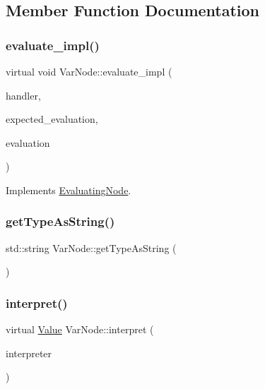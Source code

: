 \subsection{Member Function Documentation}
\mbox{\label{classVarNode_affe926e80803de0a83ce88f9a0d97db3}} 
\subsubsection{\texorpdfstring{evaluate\+\_\+impl()}{evaluate\_impl()}}
{\footnotesize\ttfamily virtual void Var\+Node\+::evaluate\+\_\+impl (\begin{DoxyParamCaption}\item[{\hyperlink{classSystemHandler}{System\+Handler} $\ast$}]{handler,  }\item[{\hyperlink{statics_8h_a6664c451ca7787483a7981cc1de68dbb}{E\+V\+A\+L\+U\+A\+T\+I\+O\+N\+\_\+\+T\+Y\+PE}}]{expected\+\_\+evaluation,  }\item[{struct \hyperlink{structEvaluation}{Evaluation} $\ast$}]{evaluation }\end{DoxyParamCaption})\hspace{0.3cm}{\ttfamily [virtual]}}



Implements \hyperlink{classEvaluatingNode_a085fa06e0b46a93c814dc55cda0c1b26}{Evaluating\+Node}.

\mbox{\label{classVarNode_afcde838758181438e89f8f91699c9d5b}} 
\subsubsection{\texorpdfstring{get\+Type\+As\+String()}{getTypeAsString()}}
{\footnotesize\ttfamily std\+::string Var\+Node\+::get\+Type\+As\+String (\begin{DoxyParamCaption}{ }\end{DoxyParamCaption})}

\mbox{\label{classVarNode_af2eed4fcade96d174c5b1f623b6bcdf6}} 
\subsubsection{\texorpdfstring{interpret()}{interpret()}}
{\footnotesize\ttfamily virtual \hyperlink{classValue}{Value} Var\+Node\+::interpret (\begin{DoxyParamCaption}\item[{\hyperlink{classInterpreter}{Interpreter} $\ast$}]{interpreter }\end{DoxyParamCaption})\hspace{0.3cm}{\ttfamily [virtual]}}



